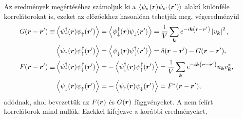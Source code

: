 \documentclass[a4paper,12pt,titlepage]{article}
\newcommand{\KK}{{\vb*{k}}}
\newcommand{\RR}{{\vb*{r}}}
\newcommand{\phantomdagger}{{\phantom{\dagger}}}
\begin{document}
Az eredmények megértéséhez számoljuk ki a $\expval{\psi_\sigma(\RR) \psi_{\sigma^\prime}(\RR^\prime)}$ alakú különféle korrelátorokat is, ezeket az előzőekhez hasonlóan tehetjük meg, végeredményül
\begin{equation}
\begin{split} \label{F-G-def}
	G(\RR - \RR^\prime) \equiv & \expval{\psi_\uparrow^\dagger(\RR) \psi_\uparrow^\phantomdagger(\RR^\prime)} = \expval{\psi_\downarrow^\dagger(\RR) \psi_\downarrow^\phantomdagger(\RR^\prime)} = \frac{1}{V} \sum\limits_\KK e^{-i \KK \left( \RR - \RR^\prime \right)} \left| v_\KK \right|^2, \\
	& \expval{\psi_\uparrow^\phantomdagger(\RR) \psi_\uparrow^\dagger(\RR^\prime)} = \expval{\psi_\downarrow^\phantomdagger(\RR) \psi_\downarrow^\dagger(\RR^\prime)} = \delta(\RR - \RR^\prime) - G(\RR - \RR^\prime), \\
	F(\RR - \RR^\prime) \equiv & \expval{\psi_\uparrow^\dagger(\RR) \psi_\downarrow^\dagger(\RR^\prime)} = -\expval{\psi_\downarrow^\dagger(\RR) \psi_\uparrow^\dagger(\RR^\prime)} = \frac{1}{V} \sum\limits_\KK e^{-i \KK \left( \RR - \RR^\prime \right)} u_\KK v_\KK^*, \\
	& \expval{\psi_\downarrow^\phantomdagger(\RR) \psi_\uparrow^\phantomdagger(\RR^\prime)} = -\expval{\psi_\uparrow^\phantomdagger(\RR) \psi_\downarrow^\phantomdagger(\RR^\prime)} = F^*(\RR - \RR^\prime),
\end{split}
\end{equation}
adódnak, ahol bevezettük az $F(\RR)$ és $G(\RR)$ függvényeket.  A nem felírt korrelátorok mind nullák.  Ezekkel kifejezve a korábbi eredményeket,
\end{document}
